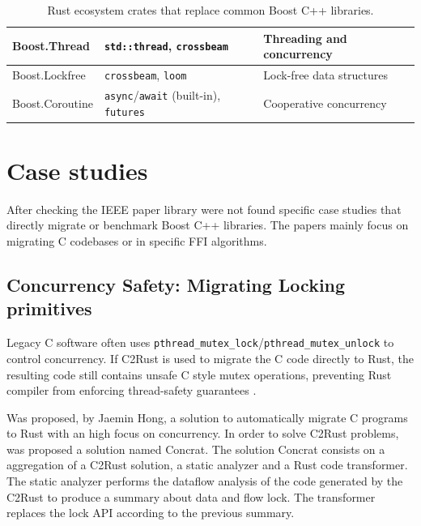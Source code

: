 \begin{table}[H]
\begin{tabular}{|l|l|l|}
        Boost.Thread &
        \texttt{std::thread}, \texttt{crossbeam} &
        Threading and concurrency \\ \hline

        Boost.Lockfree &
        \texttt{crossbeam}, \texttt{loom} &
        Lock-free data structures \\ \hline

        Boost.Coroutine &
        \texttt{async}/\texttt{await} (built-in), \texttt{futures} &
        Cooperative concurrency \\ \hline

    \end{tabular}

    \caption{Rust ecosystem crates that replace common Boost C++ libraries.}
    \label{tab:boost-rust-equivalents}
\end{table}

\break

\section{Case studies}

After checking the IEEE paper library were not found specific case studies that directly 
migrate or benchmark Boost C++ libraries. The papers mainly focus on migrating C codebases or in specific \gls{FFI} algorithms.

\subsection{Concurrency Safety: Migrating Locking primitives}

Legacy C software often uses \texttt{pthread\_mutex\_lock}/\texttt{pthread\_mutex\_unlock} to control concurrency.
If C2Rust is used to migrate the C code directly to Rust, the resulting code still contains unsafe C style mutex operations, 
preventing Rust compiler from enforcing thread-safety guarantees \parencite{c2rust}.

Was proposed, by Jaemin Hong, a solution to automatically migrate C programs to Rust with an high focus on concurrency.
In order to solve C2Rust problems, was proposed a solution named Concrat. The solution Concrat consists on a aggregation of a 
C2Rust solution, a static analyzer and a Rust code transformer. The static analyzer performs the dataflow analysis of 
the code generated by the C2Rust to produce a summary about data and flow lock. The transformer replaces the lock API
according to the previous summary.  

